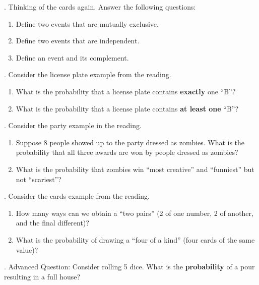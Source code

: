 \documentclass[
]{book}
\providecommand{\tightlist}{%
  \setlength{\itemsep}{0pt}\setlength{\parskip}{0pt}}
\begin{document}
. Thinking of the cards again. Answer the following questions:

\begin{enumerate}
\def\labelenumi{\alph{enumi}.}
\tightlist
\item
  Define two events that are mutually exclusive.\\
\item
  Define two events that are independent.\\
\item
  Define an event and its complement.
\end{enumerate}

. Consider the license plate example from the reading.

\begin{enumerate}
\def\labelenumi{\alph{enumi}.}
\tightlist
\item
  What is the probability that a license plate contains \textbf{exactly} one ``B''?\\
\item
  What is the probability that a license plate contains \textbf{at least one} ``B''?
\end{enumerate}

. Consider the party example in the reading.

\begin{enumerate}
\def\labelenumi{\alph{enumi}.}
\tightlist
\item
  Suppose 8 people showed up to the party dressed as zombies. What is the probability that all three awards are won by people dressed as zombies?\\
\item
  What is the probability that zombies win ``most creative'' and ``funniest'' but not ``scariest''?
\end{enumerate}

. Consider the cards example from the reading.

\begin{enumerate}
\def\labelenumi{\alph{enumi}.}
\tightlist
\item
  How many ways can we obtain a ``two pairs'' (2 of one number, 2 of another, and the final different)?\\
\item
  What is the probability of drawing a ``four of a kind'' (four cards of the same value)?
\end{enumerate}

. Advanced Question: Consider rolling 5 dice. What is the \textbf{probability} of a pour resulting in a full house?

  
\end{document}
